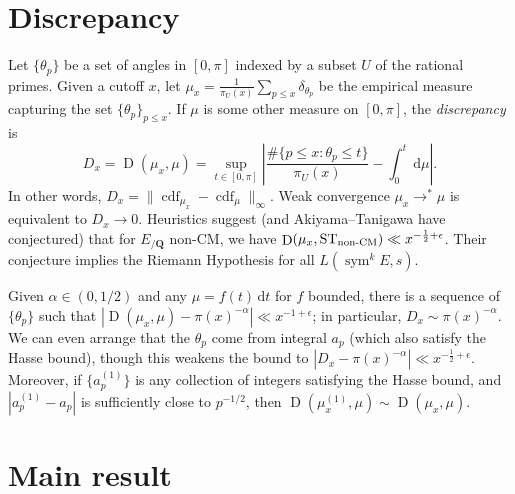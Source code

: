 \documentclass{article}
\DeclareMathOperator{\cdf}{cdf}
\DeclareMathOperator{\D}{D}
\DeclareMathOperator{\sym}{sym}
\newcommand{\bQ}{\mathbf{Q}}
\newcommand{\dd}{\mathrm{d}}
\newcommand{\nonCM}{\textnormal{non-CM}}
\newcommand{\ST}{\mathrm{ST}}
\begin{document}
\section{Discrepancy}

Let $\{\theta_p\}$ be a set of angles in $[0,\pi]$ indexed by a subset $U$ of 
the rational primes. Given a cutoff $x$, let 
$\mu_x = \frac{1}{\pi_U(x)}\sum_{p\leqslant x} \delta_{\theta_p}$ be the 
empirical measure capturing the set $\{\theta_p\}_{p\leqslant x}$. If $\mu$ is 
some other measure on $[0,\pi]$, the \emph{discrepancy} is 
\[
	D_x = \D(\mu_x,\mu) = \sup_{t\in [0,\pi]} \left| \frac{\#\{p\leqslant x : \theta_p \leqslant t\}}{\pi_U(x)} - \int_0^t \, \dd \mu\right| .
\]
In other words, $D_x = \|\cdf_{\mu_x} - \cdf_\mu\|_\infty$. Weak convergence 
$\mu_x \to^\ast \mu$ is equivalent to $D_x \to 0$. Heuristics suggest (and 
Akiyama--Tanigawa have conjectured) that for $E_{/\bQ}$ non-CM, we have 
$\D(\mu_x,\ST_\nonCM) \ll x^{-\frac 1 2+\epsilon}$. Their conjecture implies 
the Riemann Hypothesis for all $L(\sym^k E,s)$. 

Given $\alpha\in (0,1/2)$ and any $\mu = f(t)\, \dd t$ for $f$ bounded, there 
is a sequence of $\{\theta_p\}$ such that 
$|\D(\mu_x,\mu) - \pi(x)^{-\alpha}| \ll x^{-1+\epsilon}$; in particular, 
$D_x \sim \pi(x)^{-\alpha}$. We can even arrange that the $\theta_p$ come 
from integral $a_p$ (which also satisfy the Hasse bound), though this weakens 
the bound to $|D_x - \pi(x)^{-\alpha}| \ll x^{-\frac 1 2+\epsilon}$. Moreover, 
if $\{a_p^{(1)}\}$ is any collection of integers satisfying the Hasse bound, and 
$|a_p^{(1)} - a_p|$ is sufficiently close to $p^{-1/2}$, then 
$\D(\mu_x^{(1)},\mu) \sim \D(\mu_x,\mu)$. 





\section{Main result}
\end{document}
